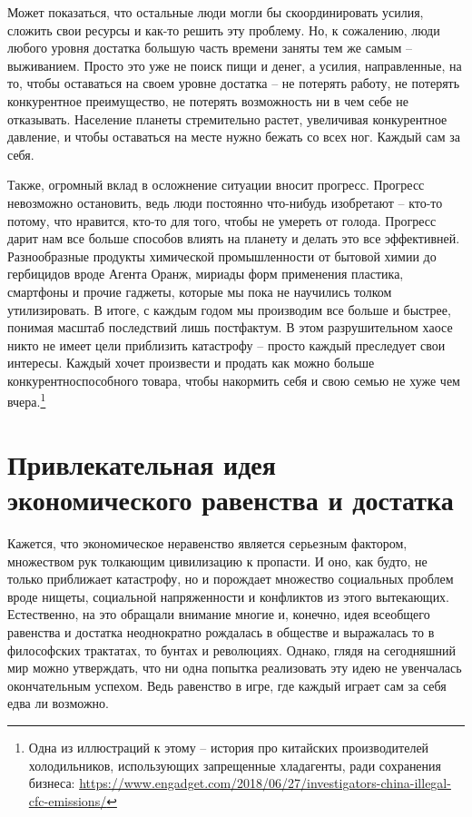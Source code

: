 \documentclass[12pt,a4paper]{report}
\begin{document}
\noindent Может показаться, что остальные люди могли бы скоординировать усилия, сложить свои ресурсы и как-то решить эту проблему. Но, к сожалению, люди любого уровня достатка большую часть времени заняты тем же самым -- выживанием. Просто это уже не поиск пищи и денег, а усилия, направленные, на то, чтобы оставаться на своем уровне достатка -- не потерять работу, не потерять конкурентное преимущество, не потерять возможность ни в чем себе не отказывать. Население планеты стремительно растет, увеличивая конкурентное давление, и чтобы оставаться на месте нужно бежать со всех ног. Каждый сам за себя.

\noindent Также, огромный вклад в осложнение ситуации вносит прогресс. Прогресс невозможно остановить, ведь люди постоянно что-нибудь изобретают -- кто-то потому, что нравится, кто-то для того, чтобы не умереть от голода. Прогресс дарит нам все больше способов влиять на планету и делать это все эффективней. Разнообразные продукты химической промышленности от бытовой химии до гербицидов вроде Агента Оранж, мириады форм применения пластика, смартфоны и прочие гаджеты, которые мы пока не научились толком утилизировать. В итоге, с каждым годом мы производим все больше и быстрее, понимая масштаб последствий лишь постфактум. В этом разрушительном хаосе никто не имеет цели приблизить катастрофу -- просто каждый преследует свои интересы. Каждый хочет произвести и продать как можно больше конкурентноспособного товара, чтобы накормить себя и свою семью не хуже чем вчера.\footnote{Одна из иллюстраций к этому -- история про китайских производителей холодильников, использующих запрещенные хладагенты, ради сохранения бизнеса: \url{https://www.engadget.com/2018/06/27/investigators-china-illegal-cfc-emissions/}}

\section*{Привлекательная идея\\экономического равенства и достатка}

Кажется, что экономическое неравенство является серьезным фактором, множеством рук толкающим цивилизацию к пропасти. И оно, как будто, не только приближает катастрофу, но и порождает множество социальных проблем вроде нищеты, социальной напряженности и конфликтов из этого вытекающих. Естественно, на это обращали внимание многие и, конечно, идея всеобщего равенства и достатка неоднократно рождалась в обществе и выражалась то в философских трактатах, то бунтах и революциях. Однако, глядя на сегодняшний мир можно утверждать, что ни одна попытка реализовать эту идею не увенчалась окончательным успехом. Ведь равенство в игре, где каждый играет сам за себя едва ли возможно.
\end{document}
